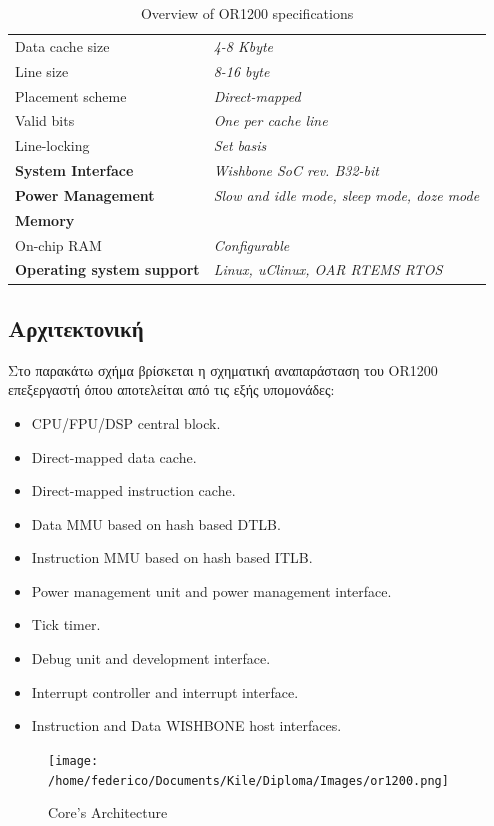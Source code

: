 \documentclass[a4paper,10pt]{article}
\numberwithin{figure}{section}
\numberwithin{table}{section}
\begin{document}
{{{\begin{table}
\begin{center}
\begin{tabular}{ll}
\rowcolor{tcD}
Data cache size & \textit{4-8 Kbyte}\\
\rowcolor{tcC}
Line size & \textit{8-16 byte}\\
\rowcolor{tcD}
Placement scheme & \textit{Direct-mapped}\\
\rowcolor{tcC}
Valid bits & \textit{One per cache line}\\
\rowcolor{tcD}
Line-locking & \textit{Set basis}\\
\rowcolor{tcC}
\textbf{System Interface} & \textit{Wishbone SoC rev. B32-bit}\\
\rowcolor{tcD}
\textbf{Power Management} & \textit{Slow and idle mode, sleep mode, doze mode}\\
\rowcolor{tcC}
\textbf{Memory} &  \\
\rowcolor{tcD}
On-chip RAM & \textit{Configurable} \\
\rowcolor{tcC}
\textbf{Operating system
support} & \textit{Linux, uClinux, OAR RTEMS RTOS}\\
\end{tabular}
\end{center}
\caption{Overview of OR1200 specifications}
\end{table}
}%
\vspace{0.7cm}
\newpage
}

\subsection{Αρχιτεκτονική}
Στο παρακάτω σχήμα βρίσκεται η σχηματική αναπαράσταση του OR1200 επεξεργαστή όπου αποτελείται από τις εξής υπομονάδες:
\begin{itemize}
 \item CPU/FPU/DSP central block.
 \item Direct-mapped data cache.
 \item Direct-mapped instruction cache.
 \item Data MMU based on hash based DTLB.
 \item Instruction MMU based on hash based ITLB.
 \item Power management unit and power management interface.
 \item Tick timer.
 \item Debug unit and development interface.
 \item Interrupt controller and interrupt interface.
 \item Instruction and Data WISHBONE host interfaces.
\end{itemize}
\begin{figure}[h!]
 \centering
 \texttt{[image: /home/federico/Documents/Kile/Diploma/Images/or1200.png]}
 \caption{Core's Architecture}
\end{figure}

}
\end{document}
